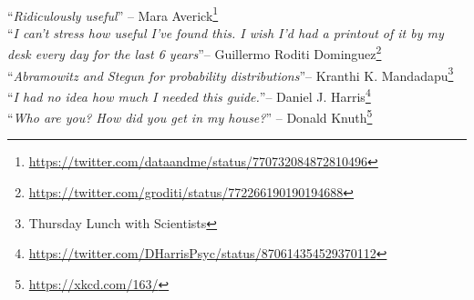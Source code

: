 ~\\

\noindent
``\emph{Ridiculously useful}'' -- Mara Averick\footnote{\url{https://twitter.com/dataandme/status/770732084872810496}}
\\

\noindent
``\emph{I can't stress how useful I've found this. I wish I'd had a printout of it by my desk every day for the last 6 years}''-- Guillermo Roditi Dominguez\footnote{\url{https://twitter.com/groditi/status/772266190190194688}}
\\

\noindent
``\emph{Abramowitz and Stegun for probability distributions}''-- Kranthi K. Mandadapu\footnote{Thursday Lunch with Scientists}
\\

\noindent
``\emph{I had no idea how much I needed this guide.}''-- Daniel J. Harris\footnote{\url{https://twitter.com/DHarrisPsyc/status/870614354529370112}}
\\



\noindent
``\emph{Who are you? How did you get in my house?}'' -- Donald Knuth\footnote{\url{https://xkcd.com/163/}}
\\

